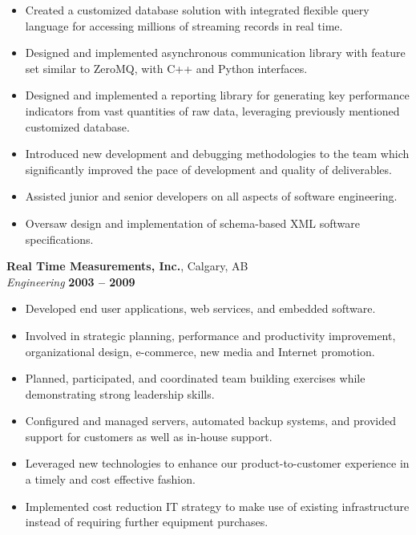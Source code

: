 \documentclass[margin,line]{resume}
\begin{document}
\begin{resume}
    \begin{itemize}
    \item Created a customized database solution with integrated flexible query language for accessing millions of streaming records in real time.
    \item Designed and implemented asynchronous communication library with feature set similar to ZeroMQ, with C++ and Python interfaces.
    \item Designed and implemented a reporting library for generating key performance indicators from vast quantities of raw data, leveraging previously mentioned customized database.
    \item Introduced new development and debugging methodologies to the team which significantly improved the pace of development and quality of deliverables.
    \item Assisted junior and senior developers on all aspects of software engineering.
    \item Oversaw design and implementation of schema-based XML software specifications.
    \end{itemize}

    \textbf{Real Time Measurements, Inc.}, Calgary, AB \vspace{2mm}\\\vspace{1mm}%
    \textsl{Engineering} \hfill \textbf{2003 -- 2009}\\

    \begin{itemize}
    \item Developed end user applications, web services, and embedded software.
    \item Involved in strategic planning, performance and productivity improvement, organizational design, e-commerce, new media and Internet promotion.
    \item Planned, participated, and coordinated team building exercises while demonstrating strong leadership skills.
    \item Configured and managed servers, automated backup systems, and provided support for customers as well as in-house support.
    \item Leveraged new technologies to enhance our product-to-customer experience in a timely and cost effective fashion.
    \item Implemented cost reduction IT strategy to make use of existing infrastructure instead of requiring further equipment purchases.
    \end{itemize}


\end{resume}
\end{document}
